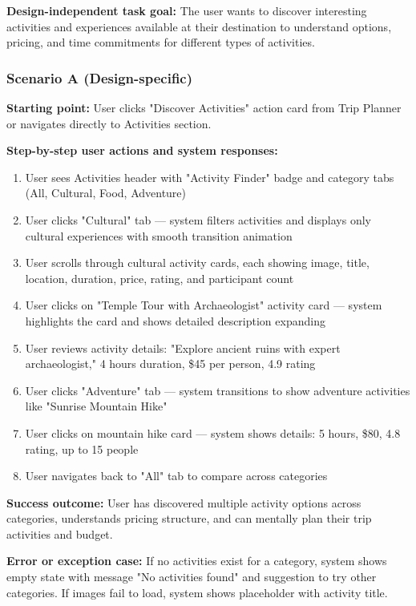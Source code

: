 \documentclass[11pt,a4paper]{article}
\begin{document}
\textbf{Design-independent task goal:}
The user wants to discover interesting activities and experiences available at their destination to understand options, pricing, and time commitments for different types of activities.

\subsubsection*{Scenario A (Design-specific)}

\textbf{Starting point:} User clicks "Discover Activities" action card from Trip Planner or navigates directly to Activities section.

\textbf{Step-by-step user actions and system responses:}
\begin{enumerate}
\item User sees Activities header with "Activity Finder" badge and category tabs (All, Cultural, Food, Adventure)
\item User clicks "Cultural" tab — system filters activities and displays only cultural experiences with smooth transition animation
\item User scrolls through cultural activity cards, each showing image, title, location, duration, price, rating, and participant count
\item User clicks on "Temple Tour with Archaeologist" activity card — system highlights the card and shows detailed description expanding
\item User reviews activity details: "Explore ancient ruins with expert archaeologist," 4 hours duration, \$45 per person, 4.9 rating
\item User clicks "Adventure" tab — system transitions to show adventure activities like "Sunrise Mountain Hike"
\item User clicks on mountain hike card — system shows details: 5 hours, \$80, 4.8 rating, up to 15 people
\item User navigates back to "All" tab to compare across categories
\end{enumerate}

\textbf{Success outcome:} User has discovered multiple activity options across categories, understands pricing structure, and can mentally plan their trip activities and budget.

\textbf{Error or exception case:} If no activities exist for a category, system shows empty state with message "No activities found" and suggestion to try other categories. If images fail to load, system shows placeholder with activity title.
\end{document}
